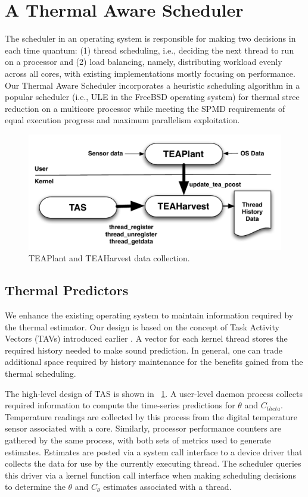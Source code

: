 \documentclass[times, 10pt,twocolumn]{IEEEtran}
\begin{document}
\section{A Thermal Aware Scheduler}
\label{sec:sdesign} The scheduler in an operating system is responsible
for making two decisions in each time quantum: (1) thread scheduling,
i.e., deciding the next thread to run on a processor and (2) load
balancing, namely, distributing workload evenly across all cores, with
existing implementations mostly focusing on performance.  Our Thermal Aware
Scheduler incorporates a heuristic scheduling algorithm in a popular scheduler
(i.e., ULE in the FreeBSD operating system) for thermal stree reduction
on a multicore processor while meeting the SPMD requirements of
equal execution progress and maximum parallelism exploitation.

\begin{figure}[btph] \centering
  \includegraphics[scale=0.45]{tasdesign}
  \caption{TEAPlant and TEAHarvest data collection.}
  \label{fig:teaplant}
\end{figure}
\subsection{Thermal Predictors}
\label{sec:therm-pred-design} We enhance the existing operating system
to maintain information required by the thermal
estimator. Our design is based on the concept of Task Activity Vectors
(TAVs) introduced earlier \cite{Merkel2008a}.  A vector for each kernel
thread stores the required history needed to make sound prediction.
In general, one can trade additional space required by history maintenance
for the benefits gained from the thermal scheduling.

The high-level design of TAS is shown in \figurename~\ref{fig:teaplant}.
A user-level daemon process collects required information to compute
the time-series predictions for $\theta$ and $C_{theta}$. Temperature
readings are collected by this process from the digital temperature
sensor associated with a core.  Similarly, processor performance
counters are gathered by the same process, with both sets of metrics
used to generate estimates. Estimates are posted via a system call
interface to a device driver that collects the data for use by
the currently executing thread.  The scheduler queries this
driver via a kernel function call interface when making scheduling
decisions to determine the $\theta$ and $C_{\theta}$ estimates
associated with a thread.
\end{document}
